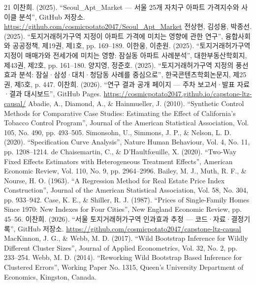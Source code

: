 \begin{thebibliography}{21}
\setlength{\itemsep}{6pt}
  이찬희. (2025). “Seoul\_Apt\_Market — 서울 25개 자치구 아파트 가격지수와 사이클 분석”, GitHub 저장소. \url{https://github.com/cosmicpotato2047/Seoul_Apt_Market}
  전상현, 김성용, 박종선. (2025). “토지거래허가구역 지정이 아파트 가격에 미치는 영향에 관한 연구”, 융합사회와 공공정책, 제19권, 제1호, pp. 169--189.
  이한웅, 이춘원. (2025). “토지거래허가구역 지정이 매매가와 전세가에 미치는 영향: 잠실동 아파트 사례분석”, 대한부동산학회지, 제43권, 제2호, pp. 161--180.
  양지영, 정준호. (2025). “토지거래허가구역 지정의 풍선효과 분석: 잠실·삼성·대치·청담동 사례를 중심으로”, 한국콘텐츠학회논문지, 제25권, 제5호, p. 447.
  이찬희. (2026). “연구 결과 공개 페이지 — 주차 보고서·발표 자료·결과 대시보드”, GitHub Pages. \url{https://cosmicpotato2047.github.io/capstone-ltz-causal/}
  Abadie, A., Diamond, A., \& Hainmueller, J. (2010). “Synthetic Control Methods for Comparative Case Studies: Estimating the Effect of California’s Tobacco Control Program”, Journal of the American Statistical Association, Vol. 105, No. 490, pp. 493--505.
  Simonsohn, U., Simmons, J. P., \& Nelson, L. D. (2020). “Specification Curve Analysis”, Nature Human Behaviour, Vol. 4, No. 11, pp. 1208--1214.
  de Chaisemartin, C., \& D’Haultfœuille, X. (2020). “Two-Way Fixed Effects Estimators with Heterogeneous Treatment Effects”, American Economic Review, Vol. 110, No. 9, pp. 2964--2996.
  Bailey, M. J., Muth, R. F., \& Nourse, H. O. (1963). “A Regression Method for Real Estate Price Index Construction”, Journal of the American Statistical Association, Vol. 58, No. 304, pp. 933--942.
  Case, K. E., \& Shiller, R. J. (1987). “Prices of Single-Family Homes Since 1970: New Indexes for Four Cities”, New England Economic Review, pp. 45--56.
  이찬희. (2026). “서울 토지거래허가구역 인과효과 추정 — 코드·자료·결정기록”, GitHub 저장소. \url{https://github.com/cosmicpotato2047/capstone-ltz-causal}
  MacKinnon, J. G., \& Webb, M. D. (2017). “Wild Bootstrap Inference for Wildly Different Cluster Sizes”, Journal of Applied Econometrics, Vol. 32, No. 2, pp. 233--254.
  Webb, M. D. (2014). “Reworking Wild Bootstrap Based Inference for Clustered Errors”, Working Paper No. 1315, Queen’s University Department of Economics, Kingston, Canada.

\end{thebibliography}
